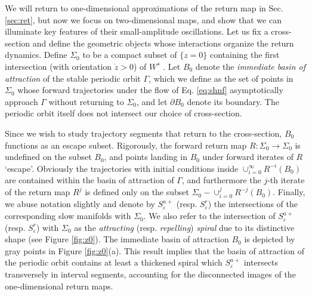 \documentclass[aip, cha, sd, amsmath,amssymb, preprint]{revtex4-1}
\begin{document}
We will return to one-dimensional approximations of the return map in Sec. \ref{sec:ret}, but now we focus on two-dimensional maps, and show that we can illuminate key features of their small-amplitude oscillations. Let us fix a cross-section and define the geometric objects whose interactions organize the return dynamics. Define $\Sigma_0$ to be a compact subset of $\{ z = 0\}$ containing the first intersection (with orientation $\dot{z} >0$) of $W^s$ . Let $B_0$ denote the {\it immediate basin of attraction} of the stable periodic orbit $\Gamma$, which we define as the set of points in $\Sigma_0$ whose forward trajectories under the flow of Eq. \eqref{eq:shnf} asymptotically approach $\Gamma$ without returning to $\Sigma_0$, and let $\partial B_0$ denote its boundary. The periodic orbit itself does not intersect our choice of cross-section. 

Since we wish to study trajectory segments that return to the cross-section, $B_0$ functions as an escape subset. Rigorously, the forward return map $R: \Sigma_0 \to \Sigma_0$ is undefined on the subset $B_0$, and points landing in $B_0$ under forward iterates of $R$ `escape'.  Obviously the trajectories with initial conditions inside $\cup_{i=0}^{\infty}R^{-i}(B_0)$ are contained within the basin of attraction of $\Gamma$, and furthermore the $j$-th iterate of the return map $R^j$ is defined only on the subset $\Sigma_0 - \cup_{i=0}^j R^{-j}(B_0)$. Finally, we abuse notation slightly and denote by $S^{a+}_{ \varepsilon}$ (resp. $S^r_{ \varepsilon}$) the intersections of the corresponding slow manifolds with $\Sigma_0$. We also refer to the intersection of $S^{a+}_{ \varepsilon}$ (resp. $S^r_{ \varepsilon}$) with $\Sigma_0$ as the {\it attracting} (resp. {\it repelling}) {\it spiral} due to its distinctive shape (see Figure \ref{fig:z0}). The immediate basin of attraction $B_0$ is depicted by gray points in Figure \ref{fig:z0}(a). This result implies that the basin of attraction of the periodic orbit contains at least a thickened spiral which $S^{a+}_{ \varepsilon}$ intersects transversely in interval segments, accounting for the disconnected images of the one-dimensional return maps. 
\end{document}
